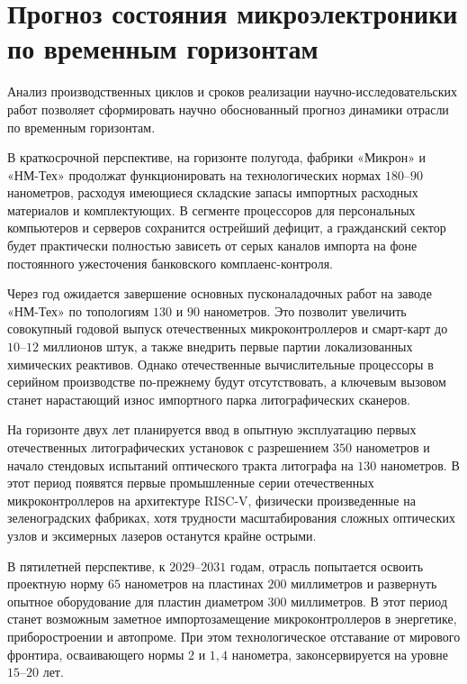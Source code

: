\documentclass[12pt,a4paper]{article}
\begin{document}
\section{Прогноз состояния микроэлектроники по временным горизонтам}

Анализ производственных циклов и сроков реализации 
научно-исследовательских работ позволяет сформировать научно 
обоснованный прогноз динамики отрасли по временным горизонтам.

В краткосрочной перспективе, на горизонте полугода, фабрики «Микрон» и 
«НМ-Тех» продолжат функционировать на технологических нормах $180$--$90$ 
нанометров, расходуя имеющиеся складские запасы импортных расходных 
материалов и комплектующих. В сегменте процессоров для персональных 
компьютеров и серверов сохранится острейший дефицит, а гражданский 
сектор будет практически полностью зависеть от серых каналов импорта 
на фоне постоянного ужесточения банковского комплаенс-контроля.

Через год ожидается завершение основных пусконаладочных работ на заводе 
«НМ-Тех» по топологиям $130$ и $90$ нанометров. Это позволит увеличить 
совокупный годовой выпуск отечественных микроконтроллеров и смарт-карт 
до $10$--$12$ миллионов штук, а также внедрить первые партии локализованных 
химических реактивов. Однако отечественные вычислительные процессоры в 
серийном производстве по-прежнему будут отсутствовать, а ключевым 
вызовом станет нарастающий износ импортного парка литографических 
сканеров.

На горизонте двух лет планируется ввод в опытную эксплуатацию первых 
отечественных литографических установок с разрешением $350$ нанометров и 
начало стендовых испытаний оптического тракта литографа на $130$ 
нанометров. В этот период появятся первые промышленные серии 
отечественных микроконтроллеров на архитектуре RISC-V, физически 
произведенные на зеленоградских фабриках, хотя трудности 
масштабирования сложных оптических узлов и эксимерных лазеров останутся 
крайне острыми.

В пятилетней перспективе, к $2029$--$2031$ годам, отрасль попытается 
освоить проектную норму $65$ нанометров на пластинах $200$ миллиметров и 
развернуть опытное оборудование для пластин диаметром $300$ миллиметров. 
В этот период станет возможным заметное импортозамещение 
микроконтроллеров в энергетике, приборостроении и автопроме. При этом 
технологическое отставание от мирового фронтира, 
осваивающего нормы $2$ и $1,4$ нанометра, законсервируется на уровне 
$15$--$20$ лет.
\end{document}
